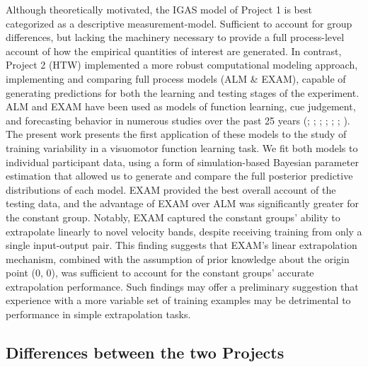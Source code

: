 \documentclass[
  11pt,
  letterpaper,
]{article}
\begin{document}
Although theoretically motivated, the IGAS model of Project 1 is best
categorized as a descriptive measurement-model. Sufficient to account
for group differences, but lacking the machinery necessary to provide a
full process-level account of how the empirical quantities of interest
are generated. In contrast, Project 2 (HTW) implemented a more robust
computational modeling approach, implementing and comparing full process
models (ALM \& EXAM), capable of generating predictions for both the
learning and testing stages of the experiment. ALM and EXAM have been
used as models of function learning, cue judgement, and forecasting
behavior in numerous studies over the past 25 years
(; ; ; ; ;
;
). The present work presents the first application of
these models to the study of training variability in a visuomotor
function learning task. We fit both models to individual participant
data, using a form of simulation-based Bayesian parameter estimation
that allowed us to generate and compare the full posterior predictive
distributions of each model. EXAM provided the best overall account of
the testing data, and the advantage of EXAM over ALM was significantly
greater for the constant group. Notably, EXAM captured the constant
groups' ability to extrapolate linearly to novel velocity bands, despite
receiving training from only a single input-output pair. This finding
suggests that EXAM's linear extrapolation mechanism, combined with the
assumption of prior knowledge about the origin point (0, 0), was
sufficient to account for the constant groups' accurate extrapolation
performance. Such findings may offer a preliminary suggestion that
experience with a more variable set of training examples may be
detrimental to performance in simple extrapolation tasks.

\subsection{Differences between the two
Projects}\label{differences-between-the-two-projects}
\end{document}
